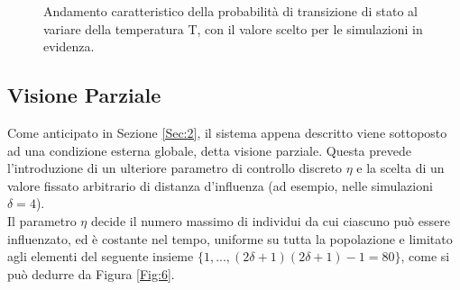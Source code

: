 \documentclass[letterpaper,10pt]{article}
\begin{document}
\bigskip
\begin{figure}[h]
\centering
{}
\caption{Andamento caratteristico della probabilità di transizione di stato al variare della temperatura T, con il valore scelto per le simulazioni in evidenza.}
\label{Fig:5}
\end{figure}

\bigskip \bigskip
\subsection{Visione Parziale}
\label{Sec:3.2}

Come anticipato in Sezione \ref{Sec:2}, il sistema appena descritto viene sottoposto ad una condizione esterna globale, detta visione parziale. Questa prevede l'introduzione di un ulteriore parametro di controllo discreto $\eta$ e la scelta di un valore fissato arbitrario di distanza d'influenza (ad esempio, nelle simulazioni $\delta=4$).
\\ Il parametro $\eta$ decide il numero massimo di individui da cui ciascuno può essere influenzato, ed è costante nel tempo, uniforme su tutta la popolazione e limitato agli elementi del seguente insieme $\{ 1, ..., (2\delta+1)(2\delta+1)-1=80\}$, come si può dedurre da Figura \ref{Fig:6}.
\end{document}
